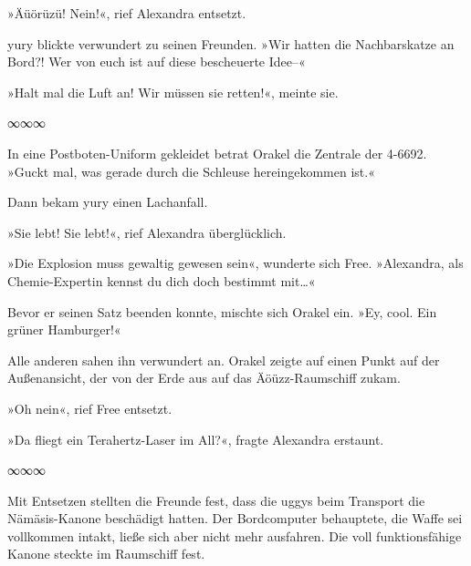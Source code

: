 »Äüörüzü! Nein!«, rief Alexandra entsetzt.

yury blickte verwundert zu seinen Freunden. »Wir hatten die Nachbarskatze an Bord?! Wer von euch ist auf diese bescheuerte Idee–«

»Halt mal die Luft an! Wir müssen sie retten!«, meinte sie.

\begin{center}
    ∞∞∞
\end{center}

In eine Postboten-Uniform gekleidet betrat Orakel die Zentrale der 4-6692. »Guckt mal, was gerade durch die Schleuse hereingekommen ist.«

Dann bekam yury einen Lachanfall.

»Sie lebt! Sie lebt!«, rief Alexandra überglücklich.

»Die Explosion muss gewaltig gewesen sein«, wunderte sich Free. »Alexandra, als Chemie-Expertin kennst du dich doch bestimmt mit…«

Bevor er seinen Satz beenden konnte, mischte sich Orakel ein. »Ey, cool. Ein grüner Hamburger!«

Alle anderen sahen ihn verwundert an. Orakel zeigte auf einen Punkt auf der Außenansicht, der von der Erde aus auf das Äöüzz-Raumschiff zukam.

»Oh nein«, rief Free entsetzt.


»Da fliegt ein Terahertz-Laser im All?«, fragte Alexandra erstaunt.


\begin{center}
    ∞∞∞
\end{center}

Mit Entsetzen stellten die Freunde fest, dass die uggys beim Transport die Nämäsis-Kanone beschädigt hatten. Der Bordcomputer behauptete, die Waffe sei vollkommen intakt, ließe sich aber nicht mehr ausfahren. Die voll funktionsfähige Kanone steckte im Raumschiff fest.

